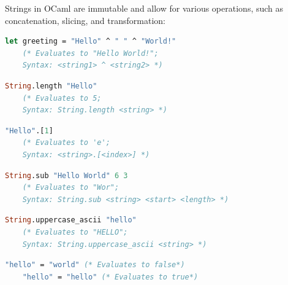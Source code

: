 \begin{Def}

Strings in OCaml are immutable and allow for various operations, such as concatenation, slicing, and transformation:

    \begin{lstlisting}[language=OCaml, caption={Creating and Concatenating Strings}, numbers=none]
    let greeting = "Hello" ^ " " ^ "World!"
    (* Evaluates to "Hello World!"; 
    Syntax: <string1> ^ <string2> *)
    \end{lstlisting}

    \begin{lstlisting}[language=OCaml, caption={Getting the Length of a String}, numbers=none]
    String.length "Hello"
    (* Evaluates to 5; 
    Syntax: String.length <string> *)
    \end{lstlisting}

    \begin{lstlisting}[language=OCaml, caption={Accessing a Character in a String}, numbers=none]
    "Hello".[1]
    (* Evaluates to 'e'; 
    Syntax: <string>.[<index>] *)
    \end{lstlisting}

    \begin{lstlisting}[language=OCaml, caption={Slicing a String}, numbers=none]
    String.sub "Hello World" 6 3
    (* Evaluates to "Wor"; 
    Syntax: String.sub <string> <start> <length> *)
    \end{lstlisting}


    \begin{lstlisting}[language=OCaml, caption={Converting to Uppercase}, numbers=none]
    String.uppercase_ascii "hello"
    (* Evaluates to "HELLO"; 
    Syntax: String.uppercase_ascii <string> *)
    \end{lstlisting}

    \begin{lstlisting}[language=OCaml, caption={String Equality}, numbers=none]
    "hello" = "world" (* Evaluates to false*)
    "hello" = "hello" (* Evaluates to true*)
    \end{lstlisting}
\end{Def}

\newpage 


